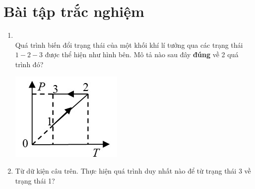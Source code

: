 \let\lesson\undefined
\newcommand{\lesson}{\phantomlesson{Bài 7.}}
\section{Bài tập trắc nghiệm}
\begin{enumerate}[label=\bfseries Câu \arabic*:, leftmargin=1.7cm]
	\item{}\\
	Quá trình biến đổi trạng thái của một khối khí lí tưởng qua các trạng thái $1-2-3$ được thể hiện như hình bên. Mô tả nào sau đây \textbf{đúng} về 2 quá trình đó?
	\begin{center}
		\includegraphics[width=0.3\linewidth]{../figs/VN12-Y24-PH-SYL-014P-9}
	\end{center}

\item Từ dữ kiện câu trên. Thực hiện quá trình duy nhất nào để từ trạng thái 3 về trạng thái 1?
	

\end{enumerate}
